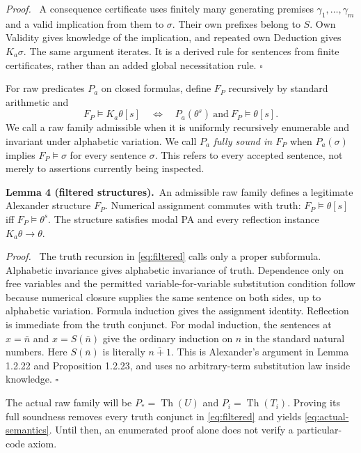 \documentclass[11pt]{article}
\newcommand{\Th}{\operatorname{Th}}
\newcommand{\qed}{\hfill\ensuremath{\square}}
\newenvironment{proof}{\par\emph{Proof.}\ }{\qed\par}
\newcommand{\statement}[2]{\par\textbf{#1.}\ #2\par}
\begin{document}
\begin{proof}
A consequence certificate uses finitely many generating premises
$\gamma_1,\ldots,\gamma_m$ and a valid implication from them to
$\sigma$. Their own prefixes belong to $S$. Own Validity gives knowledge
of the implication, and repeated own Deduction gives $K_a\sigma$.
The same argument iterates. It is a derived rule for sentences from
finite certificates, rather than an added global necessitation rule.
\end{proof}

For raw predicates $P_a$ on closed formulas, define $F_P$ recursively by
standard arithmetic and
\begin{equation}\label{eq:filtered}
 F_P\models K_a\theta[s]\quad\Longleftrightarrow\quad
 P_a(\theta^s)\ \text{and}\ F_P\models\theta[s].
\end{equation}
We call a raw family admissible when it is uniformly recursively
enumerable and invariant under alphabetic variation. We call $P_a$
\emph{fully sound in $F_P$} when $P_a(\sigma)$ implies
$F_P\models\sigma$ for every sentence $\sigma$. This refers to every
accepted sentence, not merely to assertions currently being inspected.

\statement{Lemma 4 (filtered structures)}{An admissible raw family
defines a legitimate Alexander structure $F_P$. Numerical assignment
commutes with truth: $F_P\models\theta[s]$ iff
$F_P\models\theta^s$. The structure satisfies modal PA and every
reflection instance $K_a\theta\to\theta$.}

\begin{proof}
The truth recursion in \eqref{eq:filtered} calls only a proper
subformula. Alphabetic invariance gives alphabetic invariance of truth.
Dependence only on free variables and the permitted variable-for-variable
substitution condition follow because numerical closure supplies the
same sentence on both sides, up to alphabetic variation. Formula
induction gives the assignment identity. Reflection is immediate from
the truth conjunct. For modal induction, the sentences at $x=\bar n$
and $x=S(\bar n)$ give the ordinary induction on $n$ in the standard
natural numbers. Here $S(\bar n)$ is literally $\overline{n+1}$.
This is Alexander's argument in Lemma 1.2.22 and Proposition 1.2.23,
and uses no arbitrary-term substitution law inside knowledge.
\end{proof}

The actual raw family will be $P_*=\Th(U)$ and $P_i=\Th(T_i)$.
Proving its full soundness removes every truth conjunct in
\eqref{eq:filtered} and yields \eqref{eq:actual-semantics}. Until then,
an enumerated proof alone does not verify a particular-code axiom.
\end{document}
